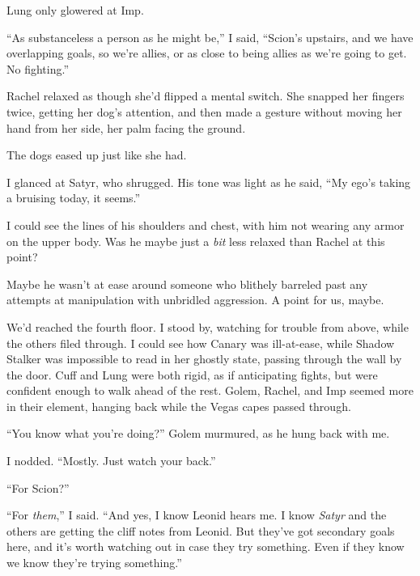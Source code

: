 Lung only glowered at Imp.



``As substanceless a person as he might be,'' I said, ``Scion's upstairs, and we have overlapping goals, so we're allies, or as close to being allies as we're going to get.  No fighting.''



Rachel relaxed as though she'd flipped a mental switch.  She snapped her fingers twice, getting her dog's attention, and then made a gesture without moving her hand from her side, her palm facing the ground.



The dogs eased up just like she had.



I glanced at Satyr, who shrugged.  His tone was light as he said, ``My ego's taking a bruising today, it seems.''



I could see the lines of his shoulders and chest, with him not wearing any armor on the upper body.  Was he maybe just a \emph{bi}\emph{t} less relaxed than Rachel at this point?



Maybe he wasn't at ease around someone who blithely barreled past any attempts at manipulation with unbridled aggression.  A point for us, maybe.



We'd reached the fourth floor.  I stood by, watching for trouble from above, while the others filed through.  I could see how Canary was ill-at-ease, while Shadow Stalker was impossible to read in her ghostly state, passing through the wall by the door.  Cuff and Lung were both rigid, as if anticipating fights, but were confident enough to walk ahead of the rest.  Golem, Rachel, and Imp seemed more in their element, hanging back while the Vegas capes passed through.



``You know what you're doing?'' Golem murmured, as he hung back with me.



I nodded.  ``Mostly.  Just watch your back.''



``For Scion?''



``For \emph{them},'' I said.  ``And yes, I know Leonid hears me.  I know \emph{Satyr} and the others are getting the cliff notes from Leonid.  But they've got secondary goals here, and it's worth watching out in case they try something.  Even if they know we know they're trying something.''



